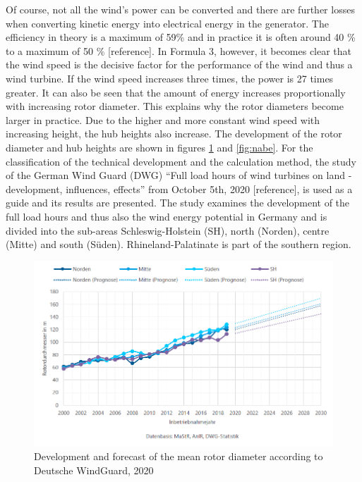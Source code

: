 \documentclass[a4paper,11pt]{article}
\begin{document}
Of course, not all the wind's power can be converted and there are further losses when converting kinetic energy into electrical energy in the generator. The efficiency in theory is a maximum of 59\% and in practice it is often around 40 \% to a maximum of 50 \% {[}reference{]}. In Formula 3, however, it becomes clear that the wind speed is the decisive factor for the performance of the wind and thus a wind turbine. If the wind speed increases three times, the power is 27 times greater. It can also be seen that the amount of energy increases proportionally with increasing rotor diameter. This explains why the rotor diameters become larger in practice. Due to the higher and more constant wind speed with increasing height, the hub heights also increase. The development of the rotor diameter and hub heights are shown in figures \ref{fig:rotor} and \ref{fig:nabe}. For the classification of the technical development and the calculation method, the study of the German Wind Guard (DWG) ``Full load hours of wind turbines on land - development, influences, effects'' from October 5th, 2020 {[}reference{]}, is used as a guide and its results are presented. The study examines the development of the full load hours and thus also the wind energy potential in Germany and is divided into the sub-areas Schleswig-Holstein (SH), north (Norden), centre (Mitte) and south (Süden). Rhineland-Palatinate is part of the southern region.
\begin{figure}

{\centering \includegraphics[width=1\linewidth]{figures/DWG/DWG_Rotordurchmesser} 

}

\caption{Development and forecast of the mean rotor diameter according to Deutsche WindGuard, 2020}\label{fig:rotor}
\end{figure}
\end{document}
